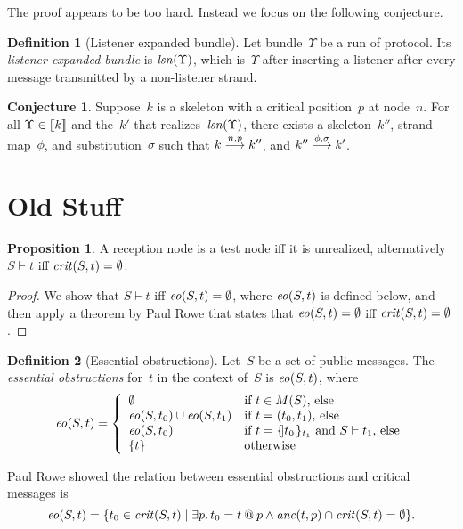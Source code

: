 \documentclass[12pt]{article}
\theoremstyle{definition}
\newtheorem{defn}{Definition}[section]
\newtheorem{conj}{Conjecture}[section]
\newtheorem{prop}{Proposition}[section]
\newcommand{\eo}{\fn{eo}}
\newcommand{\crit}{\fn{crit}}
\newcommand{\anc}{\fn{anc}}
\newcommand{\lsn}{\fn{lsn}}
\begin{document}
The proof appears to be too hard.  Instead we focus on the following
conjecture.

\begin{defn}[Listener expanded bundle]
Let bundle~$\Upsilon$ be a run of protocol.  Its \emph{listener
  expanded bundle} is $\lsn(\Upsilon)$, which is~$\Upsilon$ after
inserting a listener after every message transmitted by a non-listener
strand.
\end{defn}

\begin{conj}
Suppose~$k$ is a skeleton with a critical position~$p$ at node~$n$.
For all $\Upsilon\in[\![k]\!]$ and the~$k'$ that
realizes~$\lsn(\Upsilon)$, there exists a skeleton~$k''$, strand
map~$\phi$, and substitution~$\sigma$ such that $k\stackrel{n,p}{\longrightarrow}k''$,
and $k''\stackrel{\phi,\sigma}{\longmapsto}k'$.
\end{conj}

\appendix
\section{Old Stuff}
\begin{prop}
A reception node is a test node iff it is unrealized, alternatively
$S\vdash t$ iff $\crit(S,t)=\emptyset$.
\end{prop}
\begin{proof}
We show that $S\vdash t$ iff $\eo(S,t)=\emptyset$, where $\eo(S,t)$ is
defined below, and then apply a theorem by Paul Rowe that states that
$\eo(S,t)=\emptyset$ iff $\crit(S,t)=\emptyset$.
\end{proof}

\begin{defn}[Essential obstructions]\label{def:eo}
Let~$S$ be a set of public messages.  The \emph{essential
  obstructions} for~$t$ in the context of~$S$ is $\eo(S,t)$, where
$$\eo(S,t)=\left\{
\begin{array}{ll}
\emptyset&\mbox{if $t\in M(S)$, else}\\
\eo(S,t_0)\cup\eo(S,t_1)&\mbox{if $t=(t_0,t_1)$, else}\\
\eo(S,t_0)&\mbox{if $t=\enc{t_0}{t_1}$ and $S\vdash t_1$, else}\\
\{t\}&\mbox{otherwise}
\end{array}\right.$$
\end{defn}

Paul Rowe showed the relation between essential obstructions and
critical messages is
$$\eo(S,t)=\{t_0\in\crit(S,t)\mid
\some{p}t_0=t\termat p\land\anc(t,p)\cap\crit(S,t)=\emptyset\}.$$
\end{document}
